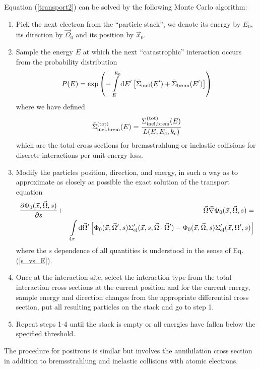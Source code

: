 Equation (\ref{transport2}) can be solved
by the following Monte Carlo algorithm:
\begin{enumerate}
\item
Pick the next electron from the ``particle stack'', we
denote its energy by $E_0$, its direction by $\vec{\Omega}_0$ and
its position by $\vec{x}_0$.
\item
Sample the energy $E$ at which the next ``catastrophic'' interaction occurs
from the probability distribution
\begin{equation}
\label{ch_Ps}
P(E) = \exp\left( - \int\limits_{E}^{E_0} {\rm d} E'
\left[\tilde{\Sigma}_{\rm inel}(E') + \tilde{\Sigma}_{\rm brem}(E') \right]
\right)
\end{equation}
where we have defined
\begin{equation}
\tilde{\Sigma}_{\rm inel, brem}^{\rm (tot)}(E) =
{\Sigma_{\rm inel,brem}^{\rm (tot)}(E) \over
L(E,E_c,k_c)}
\end{equation}
which are the total cross sections for bremsstrahlung
or inelastic collisions for discrete interactions per
unit energy loss.
\item
Modify the particles position, direction, and energy, in such a
way as to approximate as closely as possible the
exact solution of the transport equation
\begin{eqnarray}
\label{transport3}
{ \partial \Phi_0(\vec{x},\vec{\Omega},s) \over \partial s} & + &
\vec{\Omega} \vec{\nabla} \Phi_0(\vec{x},\vec{\Omega},s) =
\\
& &
\int\limits_{4 \pi} {\rm d}\vec{\Omega}'
\left[ \Phi_0(\vec{x},\vec{\Omega}',s)
\Sigma_{\rm el}'(\vec{x},s,\vec{\Omega}\cdot\vec{\Omega}') -
\Phi_0(\vec{x},\vec{\Omega},s) \Sigma_{\rm el}'(\vec{x},\Omega',s) \right]
\nonumber
\end{eqnarray}
where the $s$ dependence of all quantities is understood
in the sense of Eq. (\ref{s_vs_E}).
\item
Once at the interaction site, select the interaction type from
the total interaction cross sections at the current position and
for the current energy, sample energy and direction changes
from the appropriate differential cross section, put
all resulting particles on the stack and go to step 1.
\item
Repeat steps 1-4 until the stack is empty or all energies have
fallen below the specified threshold.
\end{enumerate}
The procedure for positrons is similar but involves the
annihilation cross section in addition to bremsstrahlung
and inelastic collisions with atomic electrons.

